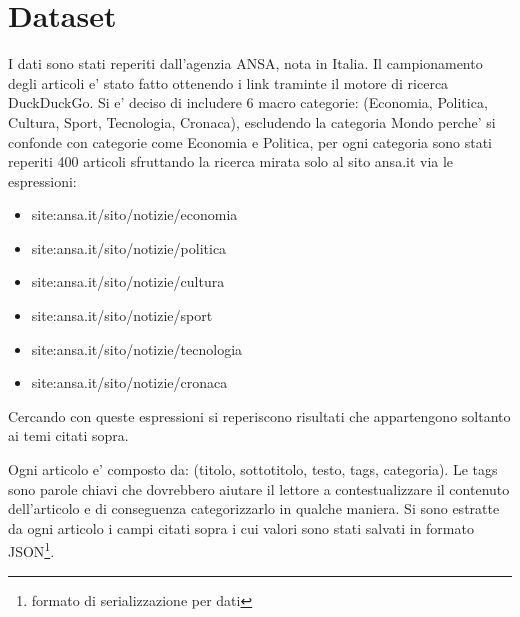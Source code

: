 \documentclass[runningheads]{llncs}
\begin{document}
%
%

\section{Dataset}
\label{sec:dataset}

I dati sono stati reperiti dall'agenzia ANSA, nota in Italia. Il campionamento degli articoli e' stato fatto ottenendo i link traminte il motore di 
ricerca DuckDuckGo. Si e' deciso di includere 6 macro categorie: (Economia, Politica, Cultura, Sport, Tecnologia, Cronaca), escludendo la categoria Mondo perche' si confonde con categorie come Economia e Politica, per
ogni categoria sono stati reperiti 400 articoli sfruttando la ricerca mirata solo al sito ansa.it via le espressioni:
\begin{itemize}
\item site:ansa.it/sito/notizie/economia
\item site:ansa.it/sito/notizie/politica
\item site:ansa.it/sito/notizie/cultura
\item site:ansa.it/sito/notizie/sport
\item site:ansa.it/sito/notizie/tecnologia
\item site:ansa.it/sito/notizie/cronaca
\end{itemize}

Cercando con queste espressioni si reperiscono risultati che appartengono soltanto ai temi citati sopra.

Ogni articolo e' composto da: (titolo, sottotitolo, testo, tags, categoria). Le tags sono parole chiavi che dovrebbero aiutare il 
lettore a contestualizzare il contenuto dell'articolo e di conseguenza categorizzarlo in qualche maniera.
Si sono estratte da ogni articolo i campi citati sopra i cui valori sono stati salvati in formato JSON\footnote{formato di serializzazione per dati}. 
\end{document}
